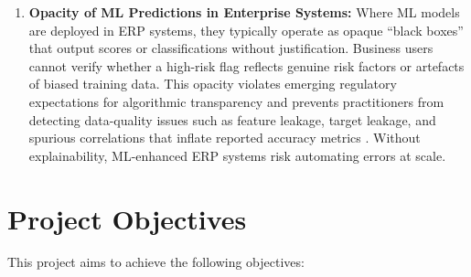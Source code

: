 \documentclass[12pt,a4paper]{report}
\begin{document}
\begin{enumerate}[label=\arabic*.]
  \item \textbf{Opacity of ML Predictions in Enterprise Systems:} Where ML models are deployed in ERP systems, they typically operate as opaque ``black boxes'' that output scores or classifications without justification. Business users cannot verify whether a high-risk flag reflects genuine risk factors or artefacts of biased training data. This opacity violates emerging regulatory expectations for algorithmic transparency \citep{eu2019ethics} and prevents practitioners from detecting data-quality issues such as feature leakage, target leakage, and spurious correlations that inflate reported accuracy metrics \citep{rudin2019stop}. Without explainability, ML-enhanced ERP systems risk automating errors at scale.
\end{enumerate}

\section{Project Objectives}
\label{sec:objectives}

This project aims to achieve the following objectives:
\end{document}
